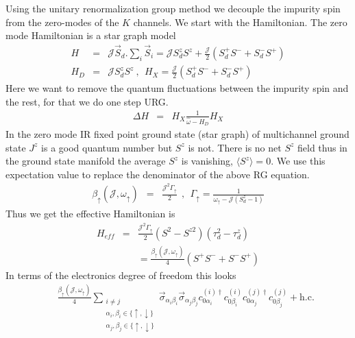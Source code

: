 \documentclass[reprint,prb,superscriptaddress]{revtex4-2}
\begin{document}
\noindent Using the unitary renormalization group method we decouple the impurity spin from the zero-modes of the $K$ channels. We start with the Hamiltonian. The zero mode Hamiltonian is a star graph model 
\begin{eqnarray}
H &=& {\mathcal{J}} \vec{S}_d.\displaystyle\sum_i \vec{S}_i ={\mathcal{J}} S_d^zS^z + \frac{{\mathcal{J}}}{2} (S_d^+S^-+ S_d^-S^+) \nonumber\\
H_D &=& {\mathcal{J}} S^z_d S^z~,~~ H_X = \frac{{\mathcal{J}}}{2} (S_d^+S^-+ S_d^-S^+)
\end{eqnarray}
Here we want to remove the quantum fluctuations between the impurity spin and the rest, for that we do one step URG.
\begin{eqnarray}
\Delta H &=& H_X \frac{1}{\hat{\omega}-H_D} H_X 
\end{eqnarray}
In the zero mode IR fixed point ground state (star graph) of multichannel ground state $J^z$ is a good quantum number but $S^z$ is not. There is no net $S^z$ field thus in the ground state manifold the average $S^z$ is vanishing, $\langle S^z \rangle=0$. We use this expectation value to replace the denominator of the above RG equation.
\begin{eqnarray}
\beta_{\uparrow} ({\mathcal{J}},\omega_{\uparrow})&=& \frac{{\mathcal{J}}^2 \Gamma_{\uparrow}}{2} ~~,~~\Gamma_{\uparrow}=\frac{1}{\omega_{\uparrow}-{\mathcal{J}}(S_d^z-1)}
\end{eqnarray}
Thus we get the effective Hamiltonian is 
\begin{eqnarray}
H_{eff} &=& \frac{{\mathcal{J}}^2 \Gamma_{\uparrow}}{2} (S^2-S^{z2})(\tau^2_{d}-\tau^z_d)  \nonumber\\
&& =\frac{\beta_{\uparrow}({\mathcal{J}},\omega_{\uparrow})}{4} (S^+S^-+S^-S^+)   
\end{eqnarray}
In terms of the electronics degree of freedom this looks 
\begin{eqnarray}
&& \frac{ \beta_{\uparrow}({\mathcal{J}},\omega_{\uparrow}) }{4}   \displaystyle\sum_{\substack{i\neq j \\ \alpha_i,\beta_i\in \{\uparrow,\downarrow\}\\ \alpha_j,\beta_j\in \{\uparrow,\downarrow\}}}\vec{\sigma}_{\alpha_i\beta_i}\vec{\sigma}_{\alpha_j\beta_j}  c_{0\alpha_i}^{(i)\dagger}  c_{0\beta_i}^{(i)}    c_{0\alpha_j}^{(j)\dagger}  c_{0\beta_j}^{(j)} +\textrm{h.c.}   \nonumber
\label{eq:all-to-all_1}
\end{eqnarray}
\end{document}
